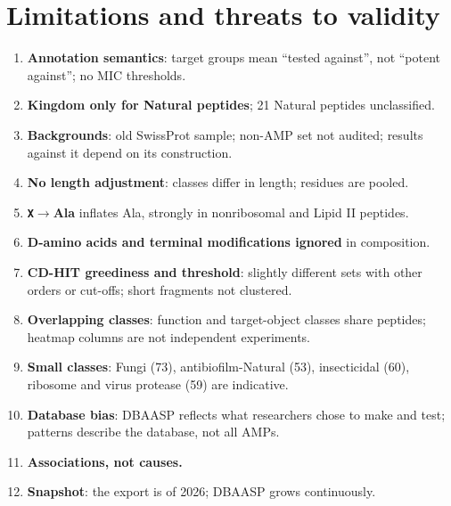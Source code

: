 \documentclass[11pt,a4paper]{article}
\begin{document}
\section{Limitations and threats to validity}
\begin{enumerate}
\item \textbf{Annotation semantics}: target groups mean ``tested against'', not ``potent against''; no MIC thresholds.
\item \textbf{Kingdom only for Natural peptides}; 21 Natural peptides unclassified.
\item \textbf{Backgrounds}: old SwissProt sample; non-AMP set not audited; results against it depend on its construction.
\item \textbf{No length adjustment}: classes differ in length; residues are pooled.
\item \textbf{\texttt{X}$\rightarrow$Ala} inflates Ala, strongly in nonribosomal and Lipid II peptides.
\item \textbf{D-amino acids and terminal modifications ignored} in composition.
\item \textbf{CD-HIT greediness and threshold}: slightly different sets with other orders or cut-offs; short fragments not clustered.
\item \textbf{Overlapping classes}: function and target-object classes share peptides; heatmap columns are not independent experiments.
\item \textbf{Small classes}: Fungi (73), antibiofilm-Natural (53), insecticidal (60), ribosome and virus protease (59) are indicative.
\item \textbf{Database bias}: DBAASP reflects what researchers chose to make and test; patterns describe the database, not all AMPs.
\item \textbf{Associations, not causes.}
\item \textbf{Snapshot}: the export is of 2026; DBAASP grows continuously.
\end{enumerate}

\end{document}
